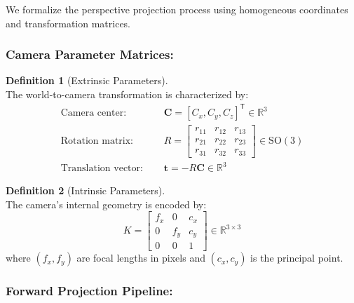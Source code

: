\documentclass[12pt]{article}
\newcommand{\R}{\mathbb{R}}
\newcommand{\vect}[1]{\bm{#1}}
\theoremstyle{definition}
\newtheorem{definition}{Definition}[section]
\begin{document}
We formalize the perspective projection process using homogeneous coordinates and transformation matrices.

\subsubsection*{Camera Parameter Matrices:}

\begin{definition}[Extrinsic Parameters] ~\\
The world-to-camera transformation is characterized by:
\begin{align}
\text{Camera center: } &\quad \vect{C} = [C_x, C_y, C_z]^\mathsf{T} \in \R^3 \\
\text{Rotation matrix: } &\quad R = \begin{bmatrix}
    r_{11} & r_{12} & r_{13} \\
    r_{21} & r_{22} & r_{23} \\
    r_{31} & r_{32} & r_{33}
\end{bmatrix} \in \text{SO}(3) \\
\text{Translation vector: } &\quad \vect{t} = -R \vect{C} \in \R^3
\end{align}
\end{definition}

\begin{definition}[Intrinsic Parameters] ~\\
The camera's internal geometry is encoded by:
\begin{equation}
K = \begin{bmatrix}
    f_x & 0 & c_x \\
    0 & f_y & c_y \\
    0 & 0 & 1
\end{bmatrix} \in \R^{3 \times 3} \label{eq:intrinsic}
\end{equation}
where $(f_x, f_y)$ are focal lengths in pixels and $(c_x, c_y)$ is the principal point.
\end{definition}

\subsubsection*{Forward Projection Pipeline:}
\end{document}
